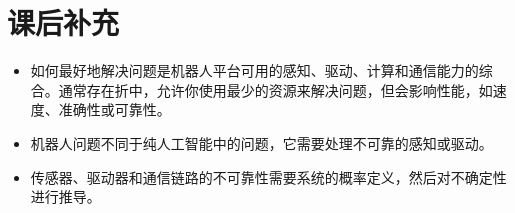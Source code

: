 \section*{课后补充}

\begin{itemize}
\item 如何最好地解决问题是机器人平台可用的感知、驱动、计算和通信能力的综合。通常存在折中，允许你使用最少的资源来解决问题，但会影响性能，如速度、准确性或可靠性。
\item 机器人问题不同于纯人工智能中的问题，它需要处理不可靠的感知或驱动。
\item 传感器、驱动器和通信链路的不可靠性需要系统的概率定义，然后对不确定性进行推导。
\end{itemize}


